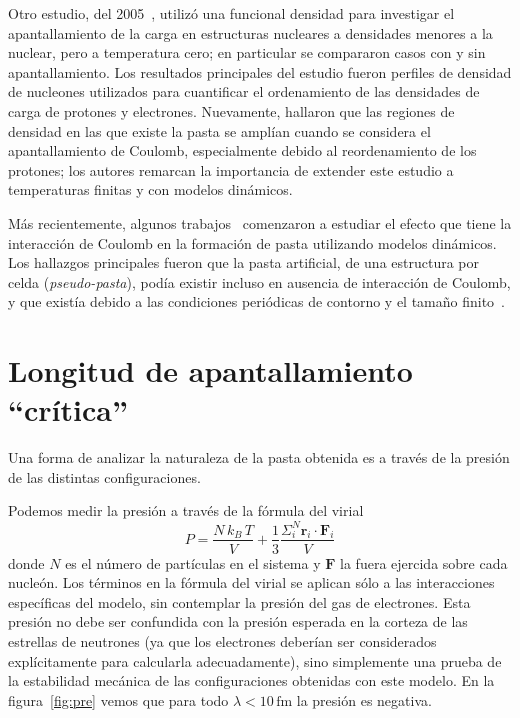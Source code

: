 Otro estudio, del 2005~\cite{maruyama_nuclear_2005}, utilizó una funcional densidad para investigar el apantallamiento de la carga en estructuras nucleares a densidades menores a la nuclear, pero a temperatura cero; en particular se compararon casos con y sin apantallamiento.
Los resultados principales del estudio fueron perfiles de densidad de nucleones utilizados para cuantificar el ordenamiento de las densidades de carga de protones y electrones.
Nuevamente, hallaron que las regiones de densidad en las que existe la pasta se amplían cuando se considera el apantallamiento de Coulomb, especialmente debido al reordenamiento de los protones; los autores remarcan la importancia de extender este estudio a temperaturas finitas y con modelos dinámicos.

Más recientemente, algunos trabajos~\cite{schneider_nuclear_2013,gimenez_molinelli_simulations_2014} comenzaron a estudiar el efecto que tiene la interacción de Coulomb en la formación de pasta utilizando modelos dinámicos.
Los hallazgos principales fueron que la pasta artificial, de una estructura por celda (\emph{pseudo-pasta}), podía existir incluso en ausencia de interacción de Coulomb, y que existía debido a las condiciones periódicas de contorno y el tamaño finito~\cite{binder_beyond_2012}.

\section{Longitud de apantallamiento ``crítica''}\label{lambda_c}

Una forma de analizar la naturaleza de la pasta obtenida es a través de la presión de las distintas configuraciones.

Podemos medir la presión a través de la fórmula del virial
\begin{equation*}
P=\frac{N\,k_B\,T}{V} + \frac{1}{3}
\frac{\Sigma_{i}^{N}\mathbf{r}_i\cdot\mathbf{F}_i}{V}
\end{equation*}
donde $N$ es el número de partículas en el sistema y $\mathbf{F}$ la fuera ejercida sobre cada nucleón.
Los términos en la fórmula del virial se aplican sólo a las interacciones específicas del modelo, sin contemplar la presión del gas de electrones.
Esta presión no debe ser confundida con la presión esperada en la corteza de las estrellas de neutrones (ya que los electrones deberían ser considerados explícitamente para calcularla adecuadamente), sino simplemente una prueba de la estabilidad mecánica de las configuraciones obtenidas con este modelo.
En la figura~\ref{fig:pre} vemos que para todo $\lambda<10\,\text{fm}$ la presión es negativa.

